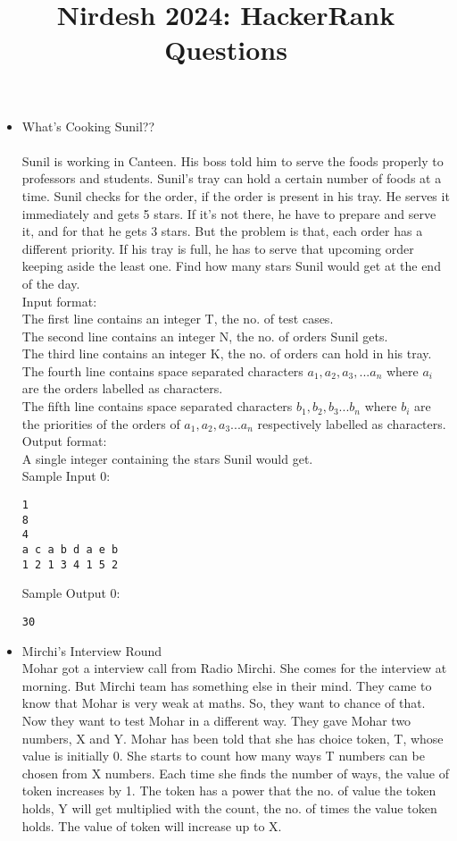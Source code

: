 \documentclass[10pt,a4paper]{article}
\title{Nirdesh 2024: HackerRank Questions}
\date{}
\begin{document}
\maketitle
\begin{itemize}
\item What’s Cooking Sunil?? \\ \\
Sunil is working in Canteen. His boss told him to serve the foods properly to professors and students. Sunil’s tray can hold a certain number of foods at a time. Sunil checks for the order, if the order is present in his tray. He serves it immediately and gets 5 stars. If it’s not there, he have to prepare and serve it, and for that he gets 3 stars. But the problem is that, each order has a different priority. If his tray is full, he has to serve that upcoming order keeping aside the least one.
Find how many stars Sunil would get at the end of the day. \\
Input format: \\
The first line contains an integer T, the no. of test cases. \\
The second line contains an integer N, the no. of orders Sunil gets. \\
The third line contains an integer K, the no. of orders can hold in his tray. \\
The fourth line contains space separated characters $a_1, a_2, a_3, ... a_n$ where $a_i$ are the orders labelled as characters. \\
The fifth line contains space separated characters $b_1, b_2, b_3 ... b_n$ where $b_i$ are the priorities of the orders of $a_1, a_2, a_3 ... a_n$  respectively labelled as characters. \\
Output format: \\
A single integer containing the stars Sunil would get. \\
Sample Input 0:
\begin{verbatim}
1 
8
4
a c a b d a e b
1 2 1 3 4 1 5 2
\end{verbatim}
Sample Output 0:
\begin{verbatim}
30
\end{verbatim}
\item Mirchi's Interview Round\\
Mohar got a interview call from Radio Mirchi. She comes for the interview at morning. But Mirchi team has something else in their mind.
They came to know that Mohar is very weak at maths. So, they want to chance of that. Now they want to test Mohar in a different way. They gave Mohar two numbers, X and Y. Mohar has been told that she has choice token, T, whose value is initially 0. She starts to count how many ways T numbers can be chosen from X numbers. Each time she finds the number of ways, the value of token increases by 1. The token has a power that the no. of value the token holds, Y will get multiplied with the count, the no. of times the value token holds. The value of token will increase up to X.\\

\end{itemize}
\end{document}
